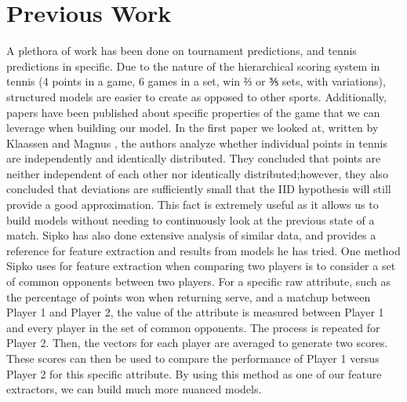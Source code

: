 \documentclass[conference]{IEEEtran}
\begin{document}

\section{Previous Work}
A plethora of work has been done on tournament predictions, and tennis predictions in specific. Due to the nature of the hierarchical scoring system in tennis (4 points in a game, 6 games in a set, win ⅔ or ⅗ sets, with variations), structured models are easier to create as opposed to other sports. Additionally, papers have been published about specific properties of the game that we can leverage  when building our model. In the first paper we looked at, written by Klaassen and Magnus \cite{iid_points}, the authors analyze whether individual points in tennis are independently and identically distributed. They concluded that points are neither independent of each other nor identically distributed;however, they also concluded that deviations are sufficiently small that the IID hypothesis will still provide a good approximation. This fact is extremely useful as it allows us to build models without needing to continuously look at the previous state of a match.
Sipko \cite{sipko} has also done extensive analysis of similar data, and provides a reference for feature extraction and results from models he has tried. One method Sipko uses for feature extraction when comparing two players is to consider a set of common opponents between two players. For a specific raw attribute, such as the percentage of points won when returning serve,  and a matchup between Player 1 and Player 2, the value of the attribute is measured between Player 1 and every player in the set of common opponents. The process is repeated for Player 2. Then, the vectors for each player are averaged to generate two scores. These scores can then be used to compare the performance of Player 1 versus Player 2 for this specific attribute. By using this method as one of our feature extractors, we can build much more nuanced models.
\end{document}
